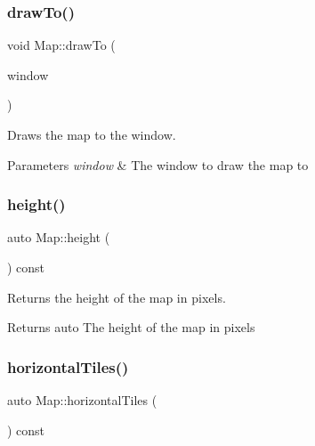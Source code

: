 \subsubsection{\texorpdfstring{drawTo()}{drawTo()}}
{\footnotesize\ttfamily void Map\+::draw\+To (\begin{DoxyParamCaption}\item[{sf\+::\+Render\+Window \&}]{window }\end{DoxyParamCaption})\hspace{0.3cm}{\ttfamily [virtual]}}



Draws the map to the window. 


\begin{DoxyParams}{Parameters}
{\em window} & The window to draw the map to \\
\hline
\end{DoxyParams}
\mbox{\label{classMap_a66196099a6d3dac0df04189446d2adb8}} 
\subsubsection{\texorpdfstring{height()}{height()}}
{\footnotesize\ttfamily auto Map\+::height (\begin{DoxyParamCaption}{ }\end{DoxyParamCaption}) const\hspace{0.3cm}{\ttfamily [inline]}}



Returns the height of the map in pixels. 

\begin{DoxyReturn}{Returns}
auto The height of the map in pixels 
\end{DoxyReturn}
\mbox{\label{classMap_ae03349d7594b92d943b52fe5de3864a9}} 
\subsubsection{\texorpdfstring{horizontalTiles()}{horizontalTiles()}}
{\footnotesize\ttfamily auto Map\+::horizontal\+Tiles (\begin{DoxyParamCaption}{ }\end{DoxyParamCaption}) const\hspace{0.3cm}{\ttfamily [inline]}}



